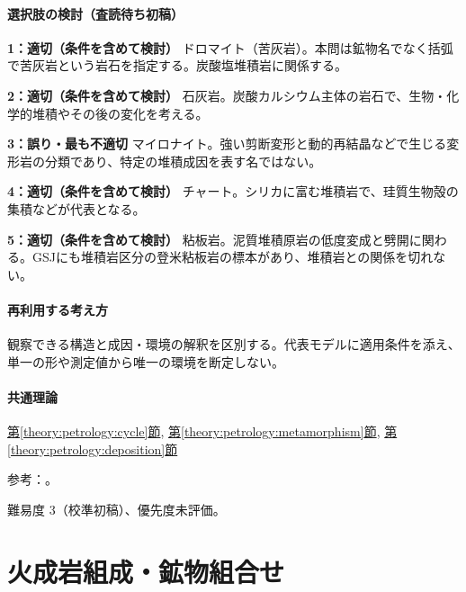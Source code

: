 \paragraph{選択肢の検討（査読待ち初稿）}\mbox{}\par

\noindent\textbf{1：適切（条件を含めて検討）} ドロマイト（苦灰岩）。本問は鉱物名でなく括弧で苦灰岩という岩石を指定する。炭酸塩堆積岩に関係する。\par

\noindent\textbf{2：適切（条件を含めて検討）} 石灰岩。炭酸カルシウム主体の岩石で、生物・化学的堆積やその後の変化を考える。\par

\noindent\textbf{3：誤り・最も不適切} マイロナイト。強い剪断変形と動的再結晶などで生じる変形岩の分類であり、特定の堆積成因を表す名ではない。\par

\noindent\textbf{4：適切（条件を含めて検討）} チャート。シリカに富む堆積岩で、珪質生物殻の集積などが代表となる。\par

\noindent\textbf{5：適切（条件を含めて検討）} 粘板岩。泥質堆積原岩の低度変成と劈開に関わる。GSJにも堆積岩区分の登米粘板岩の標本があり、堆積岩との関係を切れない。\par

\paragraph{再利用する考え方} 観察できる構造と成因・環境の解釈を区別する。代表モデルに適用条件を添え、単一の形や測定値から唯一の環境を断定しない。

\paragraph{共通理論} \hyperref[theory:petrology:cycle]{第\ref*{theory:petrology:cycle}節}, \hyperref[theory:petrology:metamorphism]{第\ref*{theory:petrology:metamorphism}節}, \hyperref[theory:petrology:deposition]{第\ref*{theory:petrology:deposition}節}

\par 参考：\cite{sed_gsj_slate}。

\par 難易度 3（校準初稿）、優先度未評価。

\section{火成岩組成・鉱物組合せ}

